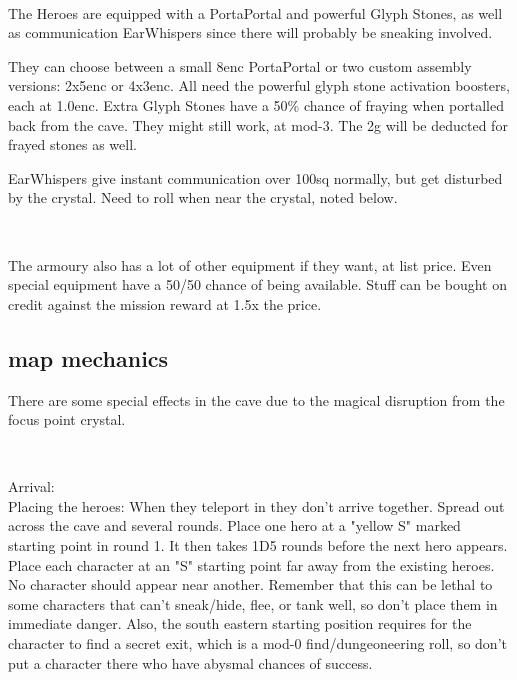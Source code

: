 \

\noindent
The Heroes are equipped with a PortaPortal and powerful Glyph Stones, as well as communication EarWhispers since there will probably be sneaking involved.

They can choose between a small 8enc PortaPortal or two custom assembly versions: 2x5enc or 4x3enc. All need the powerful glyph stone activation boosters, each at 1.0enc. Extra Glyph Stones have a 50\% chance of fraying when portalled back from the cave. They might still work, at mod-3. The 2g will be deducted for frayed stones as well.

EarWhispers give instant communication over 100sq normally, but get disturbed by the crystal. Need to roll when near the crystal, noted below.

\

The armoury also has a lot of other equipment if they want, at list price. Even special equipment have a 50/50 chance of being available. Stuff can be bought on credit against the mission reward at 1.5x the price.





\subsection*{map mechanics}
There are some special effects in the cave due to the magical disruption from the focus point crystal.

\

Arrival:\\
Placing the heroes: When they teleport in they don't arrive together. Spread out across the cave and several rounds. Place one hero at a "yellow S" marked starting point in round 1. It then takes 1D5 rounds before the next hero appears. Place each character at an "S" starting point far away from the existing heroes. No character should appear near another.
Remember that this can be lethal to some characters that can't sneak/hide, flee, or tank well, so don't place them in immediate danger. Also, the south eastern starting position requires for the character to find a secret exit, which is a mod-0 find/dungeoneering roll, so don't put a character there who have abysmal chances of success.

